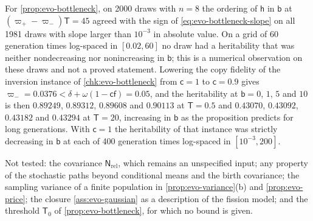 \begin{numcheck}
For \cref{prop:evo-bottleneck}, on 2000 draws with $n=8$ the ordering of $\mathsf h$ in $\mathsf b$ at $(\varpi_+-\varpi_-)\mathsf T=45$ agreed with the sign of \eqref{eq:evo-bottleneck-slope} on all 1981 draws with slope larger than $10^{-3}$ in absolute value. On a grid of 60 generation times log-spaced in $[0.02,60]$ no draw had a heritability that was neither nondecreasing nor nonincreasing in $\mathsf b$; this is a numerical observation on these draws and not a proved statement. Lowering the copy fidelity of the inversion instance of \cref{chk:evo-bottleneck} from $\mathsf c=1$ to $\mathsf c=0.9$ gives $\varpi_-=0.0376<\delta+\omega(1-\mathsf c\mathsf f)=0.05$, and the heritability at $\mathsf b=0$, $1$, $5$ and $10$ is then $0.89249$, $0.89312$, $0.89608$ and $0.90113$ at $\mathsf T=0.5$ and $0.43070$, $0.43092$, $0.43182$ and $0.43294$ at $\mathsf T=20$, increasing in $\mathsf b$ as the proposition predicts for long generations. With $\mathsf c=1$ the heritability of that instance was strictly decreasing in $\mathsf b$ at each of 400 generation times log-spaced in $[10^{-3},200]$.

Not tested: the covariance $\mathsf N_{\mathrm{rel}}$, which remains an unspecified input; any property of the stochastic paths beyond conditional means and the birth covariance; the sampling variance of a finite population in \cref{prop:evo-variance}(b) and \cref{prop:evo-price}; the closure \cref{ass:evo-gaussian} as a description of the fission model; and the threshold $\mathsf T_0$ of \cref{prop:evo-bottleneck}, for which no bound is given.
\end{numcheck}
